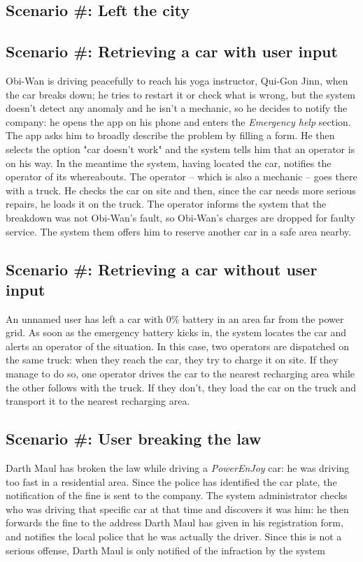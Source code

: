 \subsection{Scenario #: Left the city}	

\subsection{Scenario #: Retrieving a car with user input}
	Obi-Wan is driving peacefully to reach his yoga instructor, Qui-Gon Jinn, when the car breaks down; he tries to restart it or check what is wrong, but the system doesn't detect any anomaly and he isn't a mechanic, so he decides to notify the company: he opens the app on his phone and enters the \textit{Emergency help} section. The app asks him to broadly describe the problem by filling a form. He then selects the option "car doesn't work" and the system tells him that an operator is on his way. In the meantime the system, having located the car, notifies the operator of its whereabouts. The operator – which is also a mechanic – goes there with a truck. He checks the car on site and then, since the car needs more serious repairs, he loads it on the truck. The operator informs the system that the breakdown was not Obi-Wan's fault, so Obi-Wan's charges are dropped for faulty service. The system them offers him to reserve another car in a safe area nearby. %
	
\subsection{Scenario #: Retrieving a car without user input}
	An unnamed user has left a car with 0\% battery in an area far from the power grid. As soon as the emergency battery kicks in, the system locates the car and alerts an operator of the situation. In this case, two operators are dispatched on the same truck: when they reach the car, they try to charge it on site. If they manage to do so, one operator drives the car to the nearest recharging area while the other follows with the truck. If they don't, they load the car on the truck and transport it to the nearest recharging area. %
	
\subsection{Scenario #: User breaking the law}
	Darth Maul has broken the law while driving a \textit{PowerEnJoy} car: he was driving too fast in a residential area. Since the police has identified the car plate, the notification of the fine is sent to the company. The system administrator checks who was driving that specific car at that time and discovers it was him: he then forwards the fine to the address Darth Maul has given in his registration form, and notifies the local police that he was actually the driver. Since this is not a serious offense, Darth Maul is only notified of the infraction by the system %
	
	
